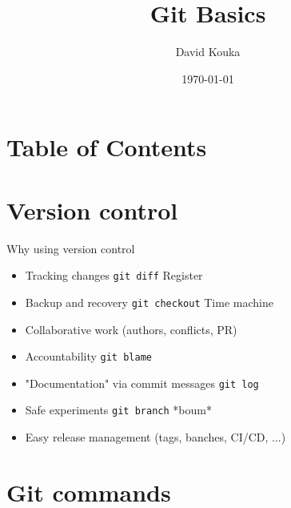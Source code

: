 \documentclass{beamer}
\title{Git Basics}
\author{David Kouka}
\date{\today}
\begin{document}
\frame{\titlepage}  %

\section{Table of Contents}

\begin{frame}
    \tableofcontents
\end{frame}

\section{Version control}

\begin{frame}{Why using version control}
    \begin{itemize}
        \item<1-> Tracking changes \lstinline{git diff} Register
        \item<2-> Backup and recovery \lstinline{git checkout} Time machine
        \item<3-> Collaborative work (authors, conflicts, PR)
        \item<4-> Accountability \lstinline{git blame}
        \item<5-> "Documentation" via commit messages \lstinline{git log}
        \item<6-> Safe experiments \lstinline{git branch} *boum*
        \item<7-> Easy release management (tags, banches, CI/CD, ...)
    \end{itemize}
\end{frame}

\section{Git commands}
\end{document}
